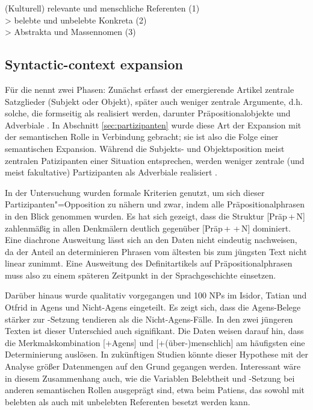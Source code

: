 \begin{exe}
	\ex \label{ex:belebtheitsskala} (Kulturell) relevante und menschliche Referenten (1)\\>  belebte und unbelebte Konkreta (2)\\> Abstrakta und Massennomen (3)
	\end{exe}


\subsection{Syntactic-context expansion} \label{sec:syn-expansion}

Für die  nennt \textcite{Himmelmann2004} zwei Phasen: Zunächst erfasst der emergierende Artikel zentrale Satzglieder (Subjekt oder Objekt), später auch weniger zentrale Argumente, d.h. solche, die formseitig als  realisiert werden, darunter Präpositionalobjekte und Adverbiale \parencite{Himmelmann1998}. In Abschnitt \ref{sec:partizipanten} wurde diese Art der Expansion mit der semantischen Rolle in Verbindung gebracht; sie ist also  die Folge einer semantischen Expansion. Während die Subjekts- und Objektsposition meist zentralen Patizipanten einer Situation entsprechen, werden weniger zentrale (und meist fakultative) Partizipanten als Adverbiale realisiert \parencite{Lehmann2004a}. 

In der Untersuchung wurden formale Kriterien genutzt, um sich dieser Partizipanten"=Opposition zu nähern und zwar, indem alle Präpositionalphrasen in den Blick genommen wurden. Es hat sich gezeigt, dass die Struktur [Präp\,+\,N] zahlenmäßig in allen Denkmälern deutlich gegenüber [Präp\,+\,\,+\,N] dominiert. Eine diachrone Ausweitung lässt sich an den Daten nicht eindeutig nachweisen, da der Anteil an determinieren Phrasen vom ältesten bis zum jüngsten Text nicht linear zunimmt. Eine Ausweitung des Definitartikels auf Präpositionalphrasen muss also zu einem späteren Zeitpunkt in der Sprachgeschichte einsetzen. 

Darüber hinaus wurde qualitativ vorgegangen und 100 NPs im Isidor, Tatian und Otfrid in Agens und Nicht-Agens eingeteilt. Es zeigt sich, dass die Agens-Belege stärker zur -Setzung tendieren als die Nicht-Agens-Fälle. In den zwei jüngeren Texten ist dieser Unterschied auch signifikant. Die Daten weisen darauf hin, dass die Merkmalskombination [+Agens] und [+(über-)menschlich] am häufigsten eine Determinierung auslösen. In zukünftigen Studien könnte dieser Hypothese mit der Analyse größer Datenmengen auf den Grund gegangen werden. Interessant wäre in diesem Zusammenhang auch, wie die Variablen Belebtheit und -Setzung bei anderen semantischen Rollen ausgeprägt sind, etwa beim Patiens, das sowohl mit belebten als auch mit unbelebten Referenten besetzt werden kann.   

